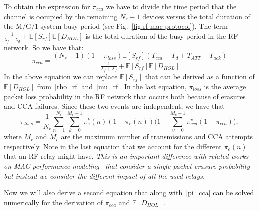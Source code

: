 \documentclass[10pt]{IEEEtran}
\begin{document}
To obtain the expression for $\pi_{cca}$ we have to divide the time period that the channel is occupied by the remaining $N_r-1$ devices versus the total duration of the M/G/1 system busy period (see Fig.~\ref{fig:rf-mac-protocol}). The term $\frac{1}{\lambda_f+\lambda_d}+\mathbb{E}[S_{rf}]\mathbb{E}[D_{HOL}]$ is the total duration of the busy period in the RF network. So we have that:
\begin{equation}\label{pi_cca}
\pi_{cca}=\frac{(N_r-1)(1-\pi_{loss})\mathbb{E}[S_{rf}](T_{cca}+ T_{d} + T_{ATT} + T_{ack})}{\frac{1}{\lambda_f+\lambda_d}+\mathbb{E}[S_{rf}]\mathbb{E}[D_{HOL}]}
\end{equation}
In the above equation we can replace $\mathbb{E}[S_{rf}]$ that can be derived as a function of $\mathbb{E}[D_{HOL}]$ from~\eqref{rho_rf} and~\eqref{mu_rf}. In the last equation, $\pi_{loss}$ is the average packet loss probability in the RF network that occurs both because of erasures and CCA failures. Since these two events are independent, we have that
\begin{equation}\label{P_loss}
    \pi_{loss}=\frac{1}{N_r}\sum_{n=1}^{N_r} \sum_{k=0}^{M_r-1}\pi_{e}^{k}(n)(1-\pi_{e}(n)) \Big (1- \sum_{\upsilon=0}^{M_c-1}\pi_{cca}^{v}(1-\pi_{cca}) \Big ),
\end{equation}
where $M_r$ and $M_c$ are the maximum number of transmissions and CCA attempts respectively. Note in the last equation that we account for the different $\pi_{e}(n)$ that an RF relay might have. \textit{This is an important difference with related works on MAC performance modeling~\cite{kim2008:performance-802154,bianchi-80211,wu02,Miluzzo08radiocharacterization} that consider a single packet erasure probability but instead we consider the different impact of all the used relays.}

Now we will also derive a second equation that along with~\eqref{pi_cca} can be solved numerically for the derivation of $\pi_{cca}$ and $\mathbb{E}[D_{HOL}]$.
\end{document}
